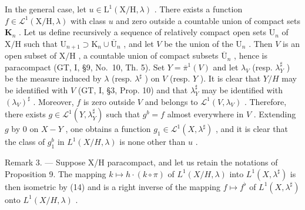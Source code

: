 In the general case, let \(u \in \mathrm{L}^1(\mathrm{X/H},\lambda)\) . There exists a function \(f \in \mathcal{L}^1(\mathrm{X/H},\lambda)\) with class \(u\) and zero outside a countable union of compact sets \(\mathbf{K}_n\) . Let us define recursively a sequence of relatively compact open sets \(\mathrm{U}_n\) of \(\mathrm{X/H}\) such that \(\mathrm{U}_{n+1} \supset \mathrm{K}_n \cup \overline{\mathrm{U}}_n\) , and let \(V\) be the union of the \(\mathrm{U}_n\) . Then \(V\) is an open subset of \(\mathrm{X/H}\) , a countable union of compact subsets \(\overline{\mathrm{U}}_n\) , hence is paracompact (GT, I, §9, No.~10, Th. 5). Set \(Y = \overline{\pi}^1(V)\) and let \(\lambda_V\) (resp. \(\lambda_Y^\sharp\) ) be the measure induced by \(\lambda\) (resp. \(\lambda^\sharp\) ) on \(V\) (resp. \(Y\) ). It is clear that \(Y/H\) may be identified with \(V\) (GT, I, §3, Prop. 10) and that \(\lambda_Y^\sharp\) may be identified with \((\lambda_V)^{\sharp}\) . Moreover, \(f\) is zero outside \(V\) and belongs to \(\mathcal{L}^1(V,\lambda_V)\) . Therefore, there exists \(g \in \mathcal{L}^1(Y,\lambda_Y^\sharp)\) such that \(g^b = f\) almost everywhere in \(V\) . Extending \(g\) by 0 on \(X - Y\) , one obtains a function \(g_1 \in \mathcal{L}^1(X,\lambda^\sharp)\) , and it is clear that the class of \(g_1^b\) in \(L^1(X/H,\lambda)\) is none other than \(u\) .

Remark 3. --- Suppose X/H paracompact, and let us retain the notations of Proposition 9. The mapping \(k \mapsto h \cdot (k \circ \pi)\) of \(L^1(X/H, \lambda)\) into \(L^1(X, \lambda^\sharp)\) is then isometric by (14) and is a right inverse of the mapping \(f \mapsto f^\flat\) of \(L^1(X, \lambda^\sharp)\) onto \(L^1(X/H, \lambda)\) .

